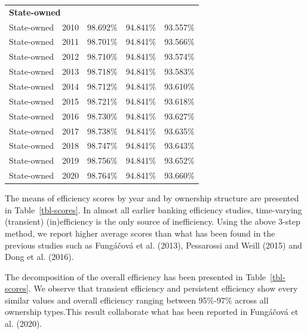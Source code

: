 \documentclass[
  12pt,
  a4paper,
]{scrreprt}
\begin{document}
{{{{\begin{longtable}[t]{llrrr}
\multicolumn{5}{l}{\textbf{State-owned}}\\
\hspace{1em}State-owned & 2010 & 98.692\% & 94.841\% & 93.557\%\\
\hspace{1em}State-owned & 2011 & 98.701\% & 94.841\% & 93.566\%\\
\hspace{1em}State-owned & 2012 & 98.710\% & 94.841\% & 93.574\%\\
\hspace{1em}State-owned & 2013 & 98.718\% & 94.841\% & 93.583\%\\
\hspace{1em}State-owned & 2014 & 98.712\% & 94.841\% & 93.610\%\\
\hspace{1em}State-owned & 2015 & 98.721\% & 94.841\% & 93.618\%\\
\hspace{1em}State-owned & 2016 & 98.730\% & 94.841\% & 93.627\%\\
\hspace{1em}State-owned & 2017 & 98.738\% & 94.841\% & 93.635\%\\
\hspace{1em}State-owned & 2018 & 98.747\% & 94.841\% & 93.643\%\\
\hspace{1em}State-owned & 2019 & 98.756\% & 94.841\% & 93.652\%\\
\hspace{1em}State-owned & 2020 & 98.764\% & 94.841\% & 93.660\%\\*

\end{longtable}

The means of efficiency scores by year and by ownership structure are
presented in Table~\ref{tbl-scores}. In almost all earlier banking
efficiency studies, time-varying (transient) (in)efficiency is the only
source of inefficiency. Using the above 3-step method, we report higher
average scores than what has been found in the previous studies such as
Fungáčová et al. (2013), Pessarossi and Weill (2015) and Dong et al.
(2016).

The decomposition of the overall efficiency has been presented in
Table~\ref{tbl-scores}. We observe that transient efficiency and
persistent efficiency show every similar values and overall efficiency
ranging between 95\%-97\% across all ownership types.This result
collaborate what has been reported in Fungáčová et al. (2020).

}}}}
\end{document}
